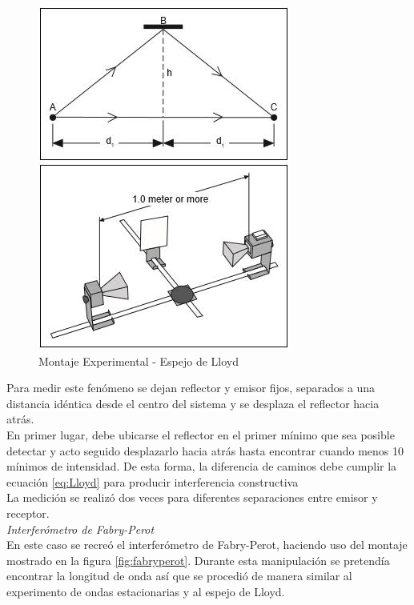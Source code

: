 \documentclass[%
 reprint,
 amsmath,amssymb,
 aps,
]{revtex4-1}
\begin{document}
\begin{figure}[h!]
\centering
\includegraphics[width=0.7\linewidth]{Pictures/espejo}
\caption{Montaje Experimental - Espejo de Lloyd}
\label{fig:espejo}
\end{figure}

Para medir este fenómeno se dejan reflector y emisor fijos, separados a una distancia idéntica desde el centro del sistema y se desplaza el reflector hacia atrás. \\

En primer lugar, debe ubicarse el reflector en el primer mínimo que sea posible detectar y acto seguido desplazarlo hacia atrás hasta encontrar cuando menos 10 mínimos de intensidad. De esta forma, la diferencia de caminos debe cumplir la ecuación \ref{eq:Lloyd} para producir interferencia constructiva\\

La medición se realizó dos veces para diferentes separaciones entre emisor y receptor.\\


\textit{Interferómetro de Fabry-Perot} \\

En este caso se recreó el interferómetro de Fabry-Perot, haciendo uso del montaje mostrado en la figura \ref{fig:fabryperot}. Durante esta manipulación se pretendía encontrar la longitud de onda así que se procedió de manera similar al experimento de ondas estacionarias y al espejo de Lloyd.\\
\end{document}

